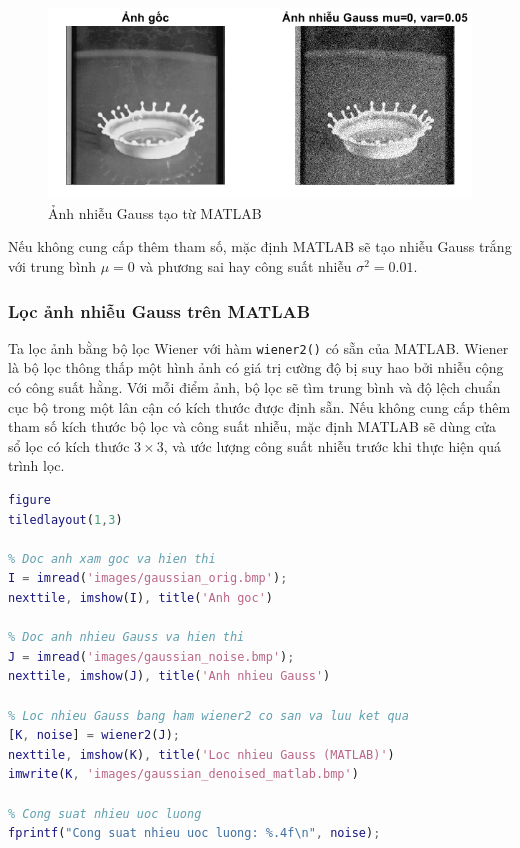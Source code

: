 \begin{figure}[H]
    \centering
    \includegraphics[width=.9\linewidth]{images/gaussian_noise_matlab.png}
    \caption{Ảnh nhiễu Gauss tạo từ MATLAB}
    \label{fig:gaussian_noise_matlab}
\end{figure}

Nếu không cung cấp thêm tham số, mặc định MATLAB sẽ tạo nhiễu Gauss trắng với trung bình $\mu = 0$ và phương sai hay công suất nhiễu $\sigma^2 = 0.01$.

\subsubsection{Lọc ảnh nhiễu Gauss trên MATLAB}

Ta lọc ảnh bằng bộ lọc Wiener với hàm \texttt{wiener2()} có sẵn của MATLAB. Wiener là bộ lọc thông thấp một hình ảnh có giá trị cường độ bị suy hao bởi nhiễu cộng có công suất hằng. Với mỗi điểm ảnh, bộ lọc sẽ tìm trung bình và độ lệch chuẩn cục bộ trong một lân cận có kích thước được định sẵn.
Nếu không cung cấp thêm tham số kích thước bộ lọc và công suất nhiễu, mặc định MATLAB sẽ dùng cửa sổ lọc có kích thước $3 \times 3$, và ước lượng công suất nhiễu trước khi thực hiện quá trình lọc.

\begin{lstlisting}[language=MATLAB]
figure
tiledlayout(1,3)

% Doc anh xam goc va hien thi
I = imread('images/gaussian_orig.bmp');
nexttile, imshow(I), title('Anh goc')

% Doc anh nhieu Gauss va hien thi
J = imread('images/gaussian_noise.bmp');
nexttile, imshow(J), title('Anh nhieu Gauss')

% Loc nhieu Gauss bang ham wiener2 co san va luu ket qua
[K, noise] = wiener2(J);
nexttile, imshow(K), title('Loc nhieu Gauss (MATLAB)')
imwrite(K, 'images/gaussian_denoised_matlab.bmp')

% Cong suat nhieu uoc luong
fprintf("Cong suat nhieu uoc luong: %.4f\n", noise);
\end{lstlisting}

